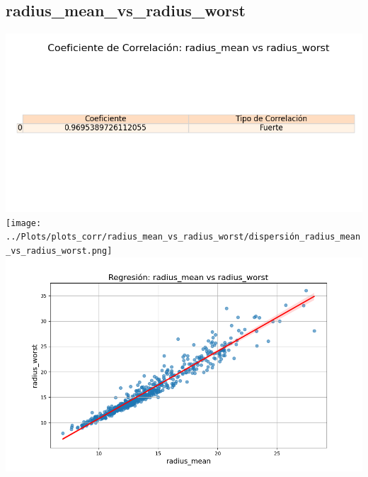 \documentclass[a4paper, 12pt]{article}
\begin{document}
\subsection{radius\_mean\_vs\_radius\_worst}
    \includegraphics[width = \textwidth]{../Plots/plots_corr/radius_mean_vs_radius_worst/coeficiente_correlacion_radius_mean_vs_radius_worst.png}
    \texttt{[image: ../Plots/plots\_corr/radius\_mean\_vs\_radius\_worst/dispersión\_radius\_mean\_vs\_radius\_worst.png]}
    \includegraphics[width = \textwidth]{../Plots/plots_corr/radius_mean_vs_radius_worst/regresion_radius_mean_vs_radius_worst.png}
\end{document}
